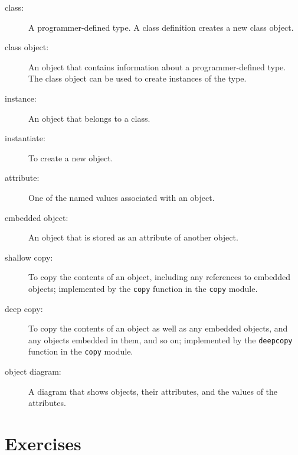\documentclass[10pt]{book}
\begin{document}
\begin{description}

\item[class:] A programmer-defined type.  A class definition creates a new
class object.

\item[class object:] An object that contains information about a
programmer-defined type.  The class object can be used to create instances
of the type.

\item[instance:] An object that belongs to a class.

\item[instantiate:] To create a new object.

\item[attribute:] One of the named values associated with an object.

\item[embedded object:] An object that is stored as an attribute
of another object.

\item[shallow copy:] To copy the contents of an object, including
any references to embedded objects;
implemented by the {\tt copy} function in the {\tt copy} module.

\item[deep copy:] To copy the contents of an object as well as any
embedded objects, and any objects embedded in them, and so on;
implemented by the {\tt deepcopy} function in the {\tt copy} module.

\item[object diagram:] A diagram that shows objects, their
attributes, and the values of the attributes.

\end{description}


\section{Exercises}
\end{document}
